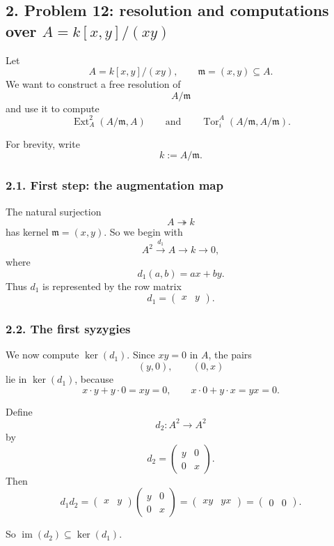 \documentclass[12pt,a4paper]{article}
\theoremstyle{notespace}
\DeclareMathOperator{\Tor}{Tor}
\DeclareMathOperator{\Ext}{Ext}
\begin{document}
\subsection{2. Problem 12: resolution and computations over \(A=k[x,y]/(xy)\)}

Let
\[
A=k[x,y]/(xy),
\qquad
\mathfrak m=(x,y)\subseteq A.
\]
We want to construct a free resolution of
\[
A/\mathfrak m
\]
and use it to compute
\[
\Ext_A^2(A/\mathfrak m,A)
\qquad \text{and} \qquad
\Tor_i^A(A/\mathfrak m,A/\mathfrak m).
\]

For brevity, write
\[
k:=A/\mathfrak m.
\]

\subsubsection{2.1. First step: the augmentation map}

The natural surjection
\[
A \twoheadrightarrow k
\]
has kernel \(\mathfrak m=(x,y)\). So we begin with
\[
A^2 \xrightarrow{d_1} A \longrightarrow k \longrightarrow 0,
\]
where
\[
d_1(a,b)=ax+by.
\]
Thus \(d_1\) is represented by the row matrix
\[
d_1=
\begin{pmatrix}
	x & y
\end{pmatrix}.
\]

\subsubsection{2.2. The first syzygies}

We now compute \(\ker(d_1)\). Since \(xy=0\) in \(A\), the pairs
\[
(y,0),\qquad (0,x)
\]
lie in \(\ker(d_1)\), because
\[
x\cdot y + y\cdot 0 = xy = 0,
\qquad
x\cdot 0 + y\cdot x = yx = 0.
\]

Define
\[
d_2:A^2\to A^2
\]
by
\[
d_2=
\begin{pmatrix}
	y & 0\\
	0 & x
\end{pmatrix}.
\]
Then
\[
d_1d_2=
\begin{pmatrix}
	x & y
\end{pmatrix}
\begin{pmatrix}
	y & 0\\
	0 & x
\end{pmatrix}
=
\begin{pmatrix}
	xy & yx
\end{pmatrix}
=
\begin{pmatrix}
	0 & 0
\end{pmatrix}.
\]

So \(\operatorname{im}(d_2)\subseteq \ker(d_1)\).
\end{document}
